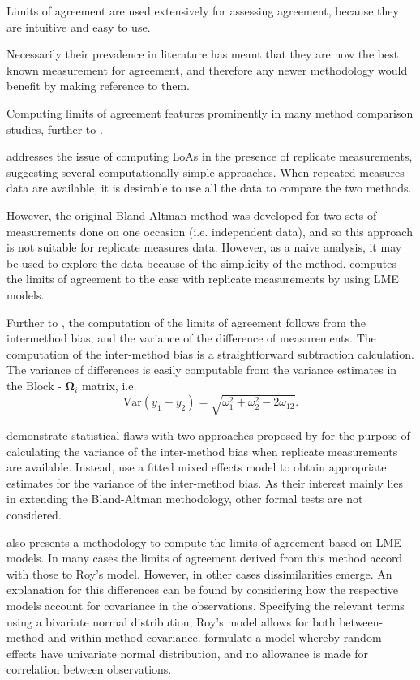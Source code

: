 \documentclass[12pt, a4paper]{report}
\theoremstyle{plain}
\theoremstyle{definition}
\theoremstyle{remark}
\begin{document}
Limits of agreement are used extensively for assessing agreement, because they are intuitive and easy to use.

Necessarily their prevalence in literature has meant that they are now the best known measurement for agreement, and therefore any newer methodology would benefit by making reference to them.

Computing limits of agreement features prominently in many method comparison studies, further to \citet{BA86,BA99}.

\citet{BA99} addresses the issue of computing LoAs in the presence of replicate measurements, suggesting several computationally simple approaches. When repeated measures data are available, it is desirable to use all the data to compare the two methods. 

However, the original Bland-Altman method was developed for two sets of measurements done on one occasion (i.e. independent data), and so this approach is not suitable for replicate measures data. However, as a naive analysis, it may be used to explore the data because of the simplicity of the method.
\citet{BXC2008}  computes the limits of agreement to the case with replicate measurements by using LME models.

  	
Further to \citet{BA86}, the computation of the limits of agreement follows from the intermethod bias, and the variance of the difference of measurements. The computation of the inter-method bias is a straightforward subtraction calculation. The variance of differences is easily computable from the variance estimates in the ${\mbox{Block - }\boldsymbol \Omega_{i}}$ matrix, i.e.
	\[
	\mathrm{Var}(y_1 - y_2) = \sqrt{ \omega^2_1 + \omega^2_2 - 2\omega_{12}}.
	\]
	
\citet{BXC2008} demonstrate statistical flaws with two approaches proposed by \citet{BA99} for the purpose of calculating the variance of the inter-method bias when replicate measurements are available. Instead, \citet{BXC2008} use a fitted mixed effects model to obtain appropriate estimates for the variance of the inter-method bias.  As their interest mainly lies in extending the Bland-Altman methodology, other formal tests are not considered.
	
	
\citet{BXC2008} also presents a methodology to compute the limits of agreement based on LME models. In many cases the limits of agreement derived from this method accord with those to Roy's model. However, in other cases dissimilarities emerge. An explanation for this differences can be found by considering how the respective models account for covariance in the observations. Specifying the relevant terms using a bivariate normal distribution, Roy's model allows for both between-method and within-method covariance. \citet{BXC2008} formulate a model whereby random effects have univariate normal distribution, and no allowance is made for correlation between observations.
	
\end{document}
